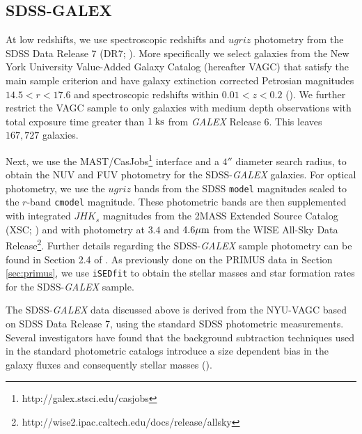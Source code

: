 \documentclass{emulateapj}
\begin{document}
\subsection{SDSS-GALEX} \label{sec:sdss}
At low redshifts, we use spectroscopic redshifts and $ugriz$ photometry from the SDSS Data Release 7 (DR7; \citealt{Abazajian:2009aa}). More specifically we select galaxies from the New York University Value-Added Galaxy Catalog (hereafter VAGC) that satisfy the main sample criterion and have galaxy extinction corrected Petrosian magnitudes $14.5 < r < 17.6$ and spectroscopic redshifts within $0.01 < z < 0.2$ (\citealt{Blanton:2005aa}). We further restrict the VAGC sample to only galaxies with medium depth observations with total exposure time greater than $1 \; \rm{ks}$ from {\em GALEX} Release 6. This leaves $167,727$ galaxies. 

Next, we use the MAST/CasJobs\footnote{http://galex.stsci.edu/casjobs} interface and a $4''$ diameter search radius, to obtain the NUV and FUV photometry for the SDSS-{\em GALEX} galaxies. For optical photometry, we use the $ugriz$ bands from the SDSS \texttt{model} magnitudes scaled to the $r$-band \texttt{cmodel} magnitude. These photometric bands are then supplemented with integrated $JHK_s$ magnitudes from the 2MASS Extended Source Catalog (XSC; \citealt{Jarrett:2000aa}) and with photometry at $3.4$ and $4.6 \mu \rm{m}$ from the WISE All-Sky Data Release\footnote{http://wise2.ipac.caltech.edu/docs/release/allsky}. Further details regarding the SDSS-{\em GALEX} sample photometry can be found in Section 2.4 of \cite{Moustakas:2013aa}. As previously done on the PRIMUS data in Section \ref{sec:primus}, we use \texttt{iSEDfit} to obtain the stellar masses and star formation rates for the SDSS-{\em GALEX} sample. 

The SDSS-{\em GALEX} data discussed above is derived from the NYU-VAGC
based on SDSS Data Release 7, using the standard SDSS photometric
measurements. Several investigators have found that the background
subtraction techniques used in the standard photometric catalogs
introduce a size dependent bias in the galaxy fluxes and consequently
stellar masses (\citealt{West:2005aa, Blanton:2005ab, Lauer:2007aa, Bernardi:2007aa,
  Hyde:2009aa, West:2010aa}).
\end{document}
